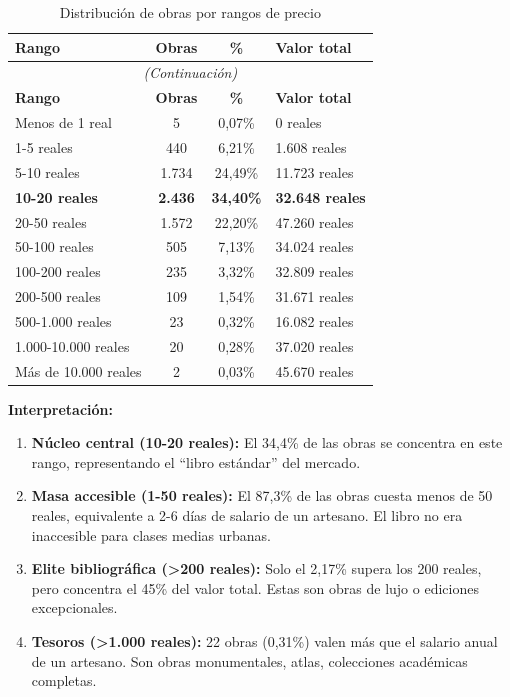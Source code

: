 \documentclass[12pt,a4paper]{article}
\begin{document}
\begin{longtable}{p{5cm}ccp{3cm}}
\caption{Distribución de obras por rangos de precio} \\
\toprule
\textbf{Rango} & \textbf{Obras} & \textbf{\%} & \textbf{Valor total} \\
\midrule
\endfirsthead
\multicolumn{4}{c}{\textit{(Continuación)}} \\
\toprule
\textbf{Rango} & \textbf{Obras} & \textbf{\%} & \textbf{Valor total} \\
\midrule
\endhead
\bottomrule
\endfoot

Menos de 1 real & 5 & 0,07\% & 0 reales \\
1-5 reales & 440 & 6,21\% & 1.608 reales \\
5-10 reales & 1.734 & 24,49\% & 11.723 reales \\
\textbf{10-20 reales} & \textbf{2.436} & \textbf{34,40\%} & \textbf{32.648 reales} \\
20-50 reales & 1.572 & 22,20\% & 47.260 reales \\
50-100 reales & 505 & 7,13\% & 34.024 reales \\
100-200 reales & 235 & 3,32\% & 32.809 reales \\
200-500 reales & 109 & 1,54\% & 31.671 reales \\
500-1.000 reales & 23 & 0,32\% & 16.082 reales \\
1.000-10.000 reales & 20 & 0,28\% & 37.020 reales \\
Más de 10.000 reales & 2 & 0,03\% & 45.670 reales \\
\end{longtable}

\textbf{Interpretación:}

\begin{enumerate}
    \item \textbf{Núcleo central (10-20 reales):} El 34,4\% de las obras se concentra en este rango, representando el ``libro estándar'' del mercado.

    \item \textbf{Masa accesible (1-50 reales):} El 87,3\% de las obras cuesta menos de 50 reales, equivalente a 2-6 días de salario de un artesano. El libro no era inaccesible para clases medias urbanas.

    \item \textbf{Elite bibliográfica (>200 reales):} Solo el 2,17\% supera los 200 reales, pero concentra el 45\% del valor total. Estas son obras de lujo o ediciones excepcionales.

    \item \textbf{Tesoros (>1.000 reales):} 22 obras (0,31\%) valen más que el salario anual de un artesano. Son obras monumentales, atlas, colecciones académicas completas.
\end{enumerate}
\end{document}
